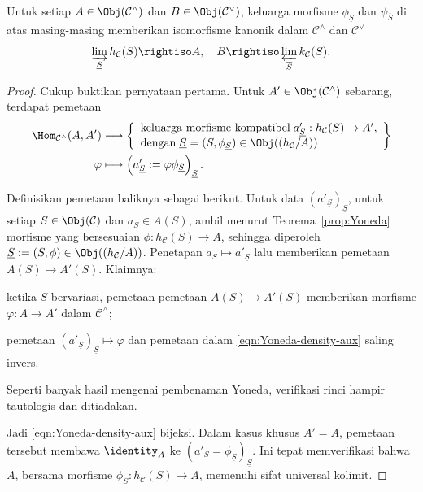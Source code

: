 \begin{theorem}[Kepadatan]\label{prop:Yoneda-density}
	Untuk setiap $A\in\Obj(\mathcal{C}^\wedge)$ dan
	$B\in\Obj(\mathcal{C}^\vee)$, keluarga morfisme
	$\phi_{\underline S}$ dan $\psi_{\overline S}$ di atas masing-masing
	memberikan isomorfisme kanonik dalam $\mathcal{C}^\wedge$ dan
	$\mathcal{C}^\vee$
	\[ \varinjlim_{\underline{S}} h_{\mathcal{C}}(S) \rightiso A, \quad B \rightiso \varprojlim_{\overline{S}} k_{\mathcal{C}}(S). \]
\end{theorem}
\begin{proof}
	Cukup buktikan pernyataan pertama. Untuk
	$A'\in\Obj(\mathcal{C}^\wedge)$ sebarang, terdapat pemetaan
	\begin{equation}\label{eqn:Yoneda-density-aux} \begin{aligned}
		\Hom_{\mathcal{C}^\wedge}(A, A') & \longrightarrow \left\{\begin{array}{l}
			\text{keluarga morfisme kompatibel}\; a'_{\underline{S}}: h_{\mathcal{C}}(S) \to A' , \\
			\text{dengan}\; \underline{S} = (S, \phi_{\underline{S}}) \in \Obj((h_{\mathcal{C}}/A))
		\end{array}\right\} \\
		\varphi & \longmapsto \left( a'_{\underline{S}} := \varphi \phi_{\underline{S}}\right)_{\underline{S}} .
	\end{aligned}\end{equation}

	Definisikan pemetaan baliknya sebagai berikut. Untuk data
	$(a'_{\underline S})_{\underline S}$, untuk setiap
	$S\in\Obj(\mathcal{C})$ dan $a_S\in A(S)$, ambil menurut
	Teorema~\ref{prop:Yoneda} morfisme yang bersesuaian
	$\phi:h_{\mathcal{C}}(S)\to A$, sehingga diperoleh
	$\underline S:=(S,\phi)\in\Obj((h_{\mathcal{C}}/A))$. Penetapan
	$a_S\mapsto a'_{\underline S}$ lalu memberikan pemetaan
	$A(S)\to A'(S)$. Klaimnya:
	\begin{compactitem}
		\item ketika $S$ bervariasi, pemetaan-pemetaan $A(S)\to A'(S)$
		memberikan morfisme $\varphi:A\to A'$ dalam $\mathcal{C}^\wedge$;
		\item pemetaan
		$(a'_{\underline S})_{\underline S}\mapsto\varphi$ dan pemetaan dalam
		\eqref{eqn:Yoneda-density-aux} saling invers.
	\end{compactitem}
	Seperti banyak hasil mengenai pembenaman Yoneda, verifikasi rinci hampir
	tautologis dan ditiadakan.

	Jadi \eqref{eqn:Yoneda-density-aux} bijeksi. Dalam kasus khusus $A'=A$,
	pemetaan tersebut membawa $\identity_A$ ke
	$(a'_{\underline S}=\phi_{\underline S})_{\underline S}$. Ini tepat
	memverifikasi bahwa $A$, bersama morfisme
	$\phi_{\underline S}:h_{\mathcal{C}}(S)\to A$, memenuhi sifat universal
	kolimit.
\end{proof}

